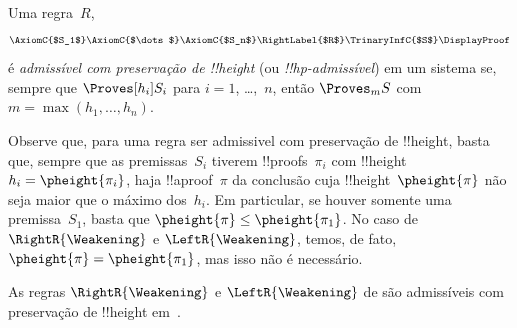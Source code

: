 \documentclass[../../../include/open-logic-section]{subfiles}
\begin{document}
\begin{defn}
Uma regra~$R$,
\[
\AxiomC{$S_1$}
\AxiomC{$\dots$}
\AxiomC{$S_n$}
\RightLabel{$R$}
\TrinaryInfC{$S$}
\DisplayProof
\]
é \emph{admissível com preservação de !!{height}} (ou
\emph{!!{hp}-admissível}) em um sistema se, sempre que $\Proves[h_i] S_i$
para $i = 1$, \dots,~$n$, então $\Proves_m S$ com $m = \max(h_1, \dots,
h_n)$.
\end{defn}

Observe que, para uma regra ser admissivel com preservação de
!!{height}, basta que, sempre que as premissas~$S_i$ tiverem !!{proof}s~$\pi_i$
com !!{height}~$h_i = \pheight{\pi_i}$, haja !!a{proof}~$\pi$ da
conclusão cuja !!{height}~$\pheight{\pi}$ não seja maior que o
máximo dos~$h_i$. Em particular, se houver somente uma
premissa~$S_1$, basta que $\pheight{\pi} \le \pheight{\pi_1}$.
No caso de $\RightR{\Weakening}$ e $\LeftR{\Weakening}$, temos, de fato,
$\pheight{\pi} = \pheight{\pi_1}$, mas isso não é
necessário.

\begin{prop}
As regras $\RightR{\Weakening}$ e $\LeftR{\Weakening}$ de  são
admissíveis com preservação de !!{height} em~.
\end{prop}
\end{document}
